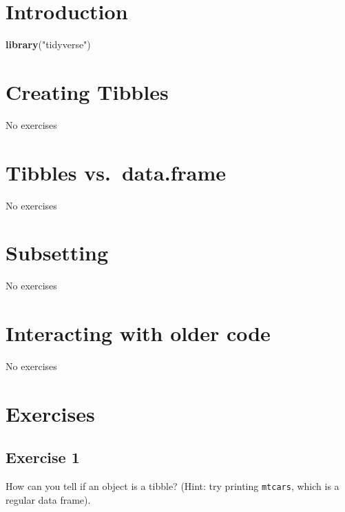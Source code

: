 \documentclass[]{book}
\newenvironment{Shaded}{\begin{snugshade}}{\end{snugshade}}
\newcommand{\KeywordTok}[1]{\textcolor[rgb]{0.13,0.29,0.53}{\textbf{#1}}}
\newcommand{\NormalTok}[1]{#1}
\newcommand{\StringTok}[1]{\textcolor[rgb]{0.31,0.60,0.02}{#1}}
\theoremstyle{definition}
\theoremstyle{definition}
\theoremstyle{definition}
\theoremstyle{remark}
\begin{document}
\hypertarget{introduction-4}{%
\section{Introduction}\label{introduction-4}}

\begin{Shaded}
\begin{Highlighting}[]
\KeywordTok{library}\NormalTok{(}\StringTok{"tidyverse"}\NormalTok{)}
\end{Highlighting}
\end{Shaded}

\hypertarget{creating-tibbles}{%
\section{Creating Tibbles}\label{creating-tibbles}}

No exercises

\hypertarget{tibbles-vs.data.frame}{%
\section{Tibbles vs.~data.frame}\label{tibbles-vs.data.frame}}

No exercises

\hypertarget{subsetting}{%
\section{Subsetting}\label{subsetting}}

No exercises

\hypertarget{interacting-with-older-code}{%
\section{Interacting with older
code}\label{interacting-with-older-code}}

No exercises

\hypertarget{exercises}{%
\section{Exercises}\label{exercises}}

\hypertarget{exercise-1-13}{%
\subsection{Exercise 1}\label{exercise-1-13}}

How can you tell if an object is a tibble? (Hint: try printing
\texttt{mtcars}, which is a regular data frame).
\end{document}
